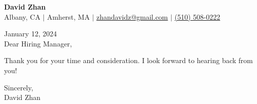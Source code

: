 \documentclass[letterpaper,12pt]{extarticle}
\begin{document}
\pagestyle{empty}

\begin{center}
\textbf{\large David Zhan}\\[2pt] %

Albany, CA $|$ Amherst, MA $|$
\href{mailto:zhandavidz@gmail.com}{zhandavidz@gmail.com} $|$ \href{tel:5105080222}{(510) 508-0222}

\end{center}

January 12, 2024\\

Dear Hiring Manager,



Thank you for your time and consideration. I look forward to hearing back from you!

Sincerely,\\
David Zhan



\end{document}
